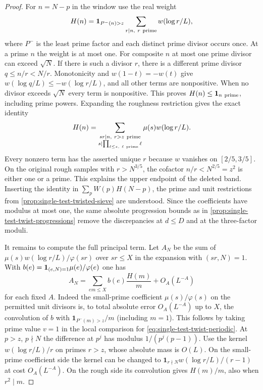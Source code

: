 \documentclass[11pt,a4paper]{article}
\numberwithin{equation}{section}
\begin{document}
\begin{proof}
For $n=N-p$ in the window use the real weight
\[
 H(n)={\bf1}_{P^-(n)>z}\sum_{r\mid n,\ r\ {\rm prime}}w(\log r/L),
\]
where $P^-$ is the least prime factor and each distinct prime
divisor occurs once. At a prime $n$ the weight is at most one.
For composite $n$ at most one prime divisor can exceed $\sqrt N$.
If there is such a divisor $r$, there is a different prime divisor
$q\le n/r<N/r$. Monotonicity and $w(1-t)=-w(t)$ give
$w(\log q/L)\le-w(\log r/L)$, and all other terms are nonpositive.
When no divisor exceeds $\sqrt N$ every term is nonpositive.
This proves $H(n)\le{\bf1}_{n\ {\rm prime}}$, including prime
powers. Expanding the roughness restriction gives the exact identity
\[
 H(n)=\sum_{\substack{sr\mid n,\ r>z\ {\rm prime}\\
                         s\mid\prod_{\ell\le z,\ \ell\ {\rm prime}}\ell}}
          \mu(s)w(\log r/L).
\]
Every nonzero term has the asserted unique $r$ because $w$
vanishes on $[2/5,3/5]$. On the original rough samples with
$r>N^{3/5}$, the cofactor $n/r<N^{2/5}=z^2$ is either one
or a prime. This explains the upper endpoint of the deleted band.
Inserting the identity in $\sum_p W(p)H(N-p)$, the prime
and unit restrictions from \cref{prop:single-test-twisted-sieve}
are understood. Since the coefficients have modulus at most
one, the same absolute progression bounds as in
\cref{prop:single-test-twist-progressions} remove the discrepancies
at $d\le D$ and at the three-factor moduli.

It remains to compute the full principal term. Let $A_N$ be
the sum of $\mu(s)w(\log r/L)/\varphi(sr)$ over $sr\le X$ in
the expansion with $(sr,N)=1$. With
$b(e)={\bf1}_{(e,N)=1}\mu(e)/\varphi(e)$ one has
\[
 A_N=\sum_{em\le X} b(e)\frac{H(m)}{m}+O_A(L^{-A})
\]
for each fixed $A$. Indeed the small-prime coefficient
$\mu(s)/\varphi(s)$ on the permitted unit divisors is, to
total absolute error $O_A(L^{-A})$ up to $X$, the convolution
of $b$ with $\mathbf1_{P^-(m)>z}/m$ (including $m=1$).
This follows by taking prime value $v=1$ in the local comparison
for \eqref{eq:single-test-twist-periodic}. At $p>z$, $p\nmid N$ the
difference at $p^j$ has modulus $1/(p^j(p-1))$. Use the kernel
$w(\log r/L)/r$ on primes $r>z$, whose absolute mass is $O(L)$.
On the small-prime coefficient side the kernel can be changed to
$\mathbf1_{r\nmid N}w(\log r/L)/(r-1)$ at cost $O_A(L^{-A})$.
On the rough side its convolution gives $H(m)/m$, also when
$r^2\mid m$.


\end{proof}
\end{document}
